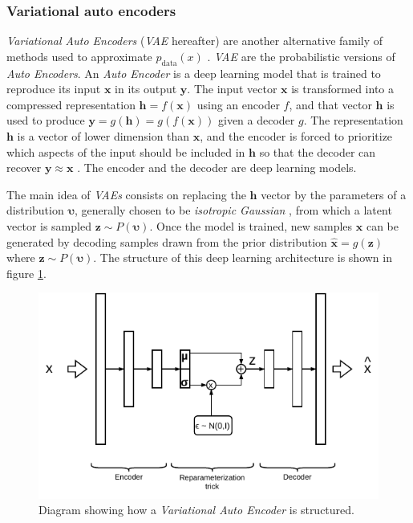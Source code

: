 \subsubsection{Variational auto encoders}
\textit{Variational Auto Encoders} (\textit{VAE} hereafter) are another alternative family of methods used to approximate $p_\mathrm{data}(x)$ \cite{kingma2019}. \textit{VAE} are the probabilistic versions of \textit{Auto Encoders}. An \textit{Auto Encoder} is a deep learning model that is trained to reproduce its input $\mathbf{x}$ in its output $\mathbf{y}$. The input vector $\mathbf{x}$ is transformed into a compressed representation $\mathbf{h}=f(\mathbf{x})$ using an encoder $f$, and that vector $\mathbf{h}$ is used to produce $\mathbf{y}=g(\mathbf{h})=g(f(\mathbf{x}))$ given a decoder $g$. The representation $\mathbf{h}$ is a vector of lower dimension than $\mathbf{x}$, and the encoder is forced to prioritize which aspects of the input should be included in $\mathbf{h}$ so that the decoder can recover $\mathbf{y}\approx \mathbf{x}$ \cite{Goodfellow2016}. The encoder and the decoder are deep learning models. 

The main idea of \textit{VAEs} consists on replacing the $\mathbf{h}$ vector by the parameters of a distribution $\mathbf{\upsilon}$, generally chosen to be \textit{isotropic Gaussian} \cite{asperti2021}, from which a latent vector is sampled $\mathbf{z} \sim P(\mathbf{\upsilon})$. Once the model is trained, new samples $\mathbf{\hat{x}}$ can be generated by decoding samples drawn from the prior distribution $\mathbf{\hat{x}} = g(\mathbf{z})$ where $\mathbf{z} \sim P(\mathbf{\upsilon})$. The structure of this deep learning architecture is shown in figure \ref{fig:vae}.

\begin{figure}
	\centering
	\includegraphics[width=0.7\linewidth]{chapter2/images/vae}
	\caption{Diagram showing how a \textit{Variational Auto Encoder} is structured. }
	\label{fig:vae}
\end{figure}



